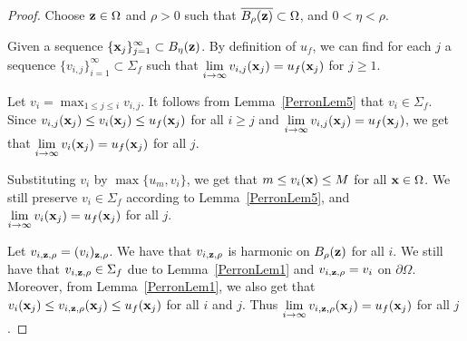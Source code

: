 \begin{proof}
Choose $\mathbf{z} \in \Omega$ and $\rho>0$ such that
$\displaystyle \overline{B_{\rho}(\mathbf{z})} \subset \Omega$,
and $0 < \eta < \rho$.

 Given a sequence
$\displaystyle \{\mathbf{x}_j\}_{j=1}^\infty \subset B_\eta(\mathbf{z})$.
By definition of $u_f$, we can find for each $j$ a sequence
$\displaystyle \{v_{i,j}\}_{i=1}^\infty \subset \Sigma_f$ such that
$\displaystyle \lim_{i \to \infty} v_{i,j}(\mathbf{x}_j) = u_f(\mathbf{x}_j)$
for $j \geq 1$.

Let $\displaystyle v_i = \max_{1\leq j \leq i} v_{i,j}$.  It follows
from Lemma~\ref{PerronLem5} that $v_i \in \Sigma_f$.  Since
$\displaystyle v_{i,j}(\mathbf{x}_j) \leq v_i(\mathbf{x}_j) \leq u_f(\mathbf{x}_j)$
for all $i \geq j$ and
$\displaystyle \lim_{i \to \infty} v_{i,j}(\mathbf{x}_j) = u_f(\mathbf{x}_j)$,
we get that
$\displaystyle \lim_{i \to \infty} v_i(\mathbf{x}_j) = u_f(\mathbf{x}_j)$
for all $j$.

Substituting $v_i$ by $\max \{u_m,v_i\}$, we get that
$m \leq v_i(\mathbf{x}) \leq M$ for all $\mathbf{x} \in \Omega$.  We still
preserve $v_i \in \Sigma_f$ according to Lemma~\ref{PerronLem5},
and
$\displaystyle \lim_{i \to \infty} v_i(\mathbf{x}_j) = u_f(\mathbf{x}_j)$
for all $j$.

Let $v_{i,\mathbf{z},\rho} = (v_i)_{\mathbf{z},\rho}$.  We have that
$v_{i,\mathbf{z},\rho}$ is harmonic on $B_\rho(\mathbf{z})$ for all $i$.
We still have that $v_{i,\mathbf{z},\rho} \in \Sigma_f$
due to Lemma~\ref{PerronLem1} and
$v_{i,\mathbf{z},\rho} = v_i$ on $\partial \Omega$.  Moreover,
from Lemma~\ref{PerronLem1}, we also get that
$\displaystyle v_i(\mathbf{x}_j) \leq v_{i,\mathbf{z},\rho}(\mathbf{x}_j)
\leq u_f(\mathbf{x}_j)$ for all $i$ and $j$.  Thus
$\displaystyle \lim_{i \to \infty} v_{i,\mathbf{z},\rho}(\mathbf{x}_j) = u_f(\mathbf{x}_j)$
for all $j$.


\end{proof}
